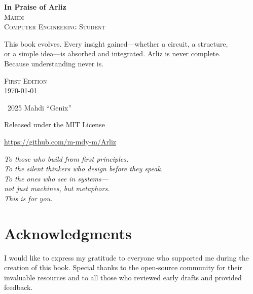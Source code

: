 \documentclass[12pt, oneside]{book}
\begin{document}
	
	\frontmatter

\begin{titlepage}
	\begin{center}
		\vspace*{2cm}
		
		{\Huge\bfseries In Praise of Arliz}\\[2em]
		
		{\Large\scshape Mahdi}\\[0.5em]
		\textsc{Computer Engineering Student}\\[2em]
		
		\begin{minipage}{1\textwidth}
			\centering
			This book evolves. Every insight gained—whether a circuit, a structure,\\
				or a simple idea—is absorbed and integrated. Arliz is never complete.\\
				Because understanding never is.
		\end{minipage}
		
		\vfill
		
	
	{\large \textsc{First Edition}}\\[0.5em]
	{\large \today}
	
	\vspace*{1cm}
	{\small
		\textcopyright\ 2025 Mahdi “Genix”  
		\par
		Released under the MIT License  
		\par
		\url{https://github.com/m-mdy-m/Arliz}
	}
	\end{center}
\end{titlepage}

\cleardoublepage
\thispagestyle{empty}
\vspace*{6cm}
\begin{center}
	\emph{
		To those who build from first principles.\\
		To the silent thinkers who design before they speak.\\
		To the ones who see in systems—\\
		not just machines, but metaphors.\\
		This is for you.}
\end{center}
\chapter*{Acknowledgments}
\thispagestyle{empty}
I would like to express my gratitude to everyone who supported me during the creation of this book. Special thanks to the open-source community for their invaluable resources and to all those who reviewed early drafts and provided feedback.
\end{document}
